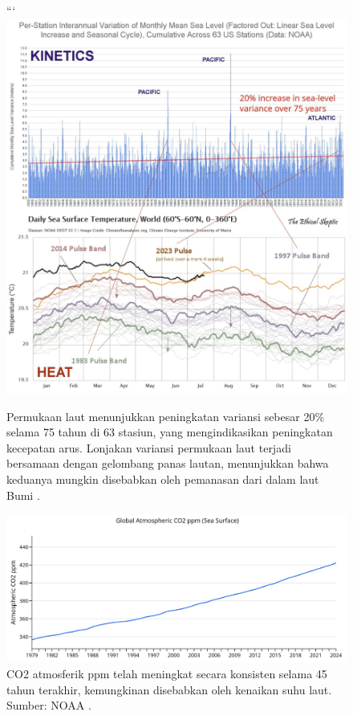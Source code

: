 \documentclass[10pt,twocolumn,letterpaper]{article}
\begin{document}
\begin{figure}[t]
\begin{center}
```
\includegraphics[width=1\textwidth]{sealevel.jpeg}
\end{center}
   \caption{Permukaan laut menunjukkan peningkatan variansi sebesar 20\% selama 75 tahun di 63 stasiun, yang mengindikasikan peningkatan kecepatan arus. Lonjakan variansi permukaan laut terjadi bersamaan dengan gelombang panas lautan, menunjukkan bahwa keduanya mungkin disebabkan oleh pemanasan dari dalam laut Bumi \cite{2,129}.}
\label{fig:22}
\end{figure}

\begin{figure}[t]
\begin{center}
\includegraphics[width=1\textwidth]{co2.jpg}
\end{center}
   \caption{CO2 atmosferik ppm telah meningkat secara konsisten selama 45 tahun terakhir, kemungkinan disebabkan oleh kenaikan suhu laut. Sumber: NOAA \cite{148,129}.}
\label{fig:23}
\end{figure}
\end{document}
